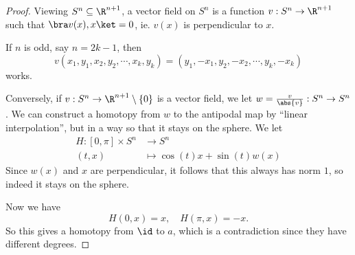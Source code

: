 \documentclass[a4paper]{article}
\begin{document}
\begin{proof}
  Viewing $S^n \subseteq \R^{n + 1}$, a vector field on $S^n$ is a function $v: S^n \to \R^{n + 1}$ such that $\bra v(x), x\ket = 0$, ie. $v(x)$ is perpendicular to $x$.

  If $n$ is odd, say $n = 2k - 1$, then
  \[
    v(x_1, y_1, x_2, y_2, \cdots, x_k, y_k) = (y_1, -x_1, y_2, -x_2, \cdots, y_k, -x_k)
  \]
  works.

  Conversely, if $v: S^n \to \R^{n + 1} \setminus \{0\}$ is a vector field, we let $w = \frac{v}{\abs{v}}: S^n \to S^n$. We can construct a homotopy from $w$ to the antipodal map by ``linear interpolation'', but in a way so that it stays on the sphere. We let
  \begin{align*}
    H: [0, \pi] \times S^n &\to S^n\\
    (t, x) &\mapsto \cos(t) x + \sin(t) w(x)
  \end{align*}
  Since $w(x)$ and $x$ are perpendicular, it follows that this always has norm $1$, so indeed it stays on the sphere.

  Now we have
  \[
    H(0, x) = x,\quad H(\pi, x) = -x.
  \]
  So this gives a homotopy from $\id$ to $a$, which is a contradiction since they have different degrees.
\end{proof}
\end{document}
